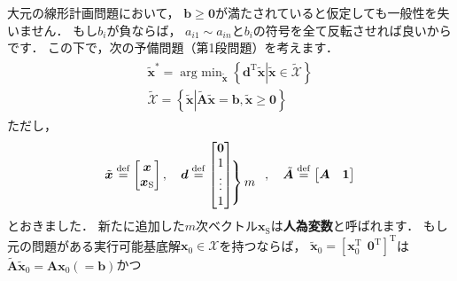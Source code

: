 ﻿\documentclass[a4paper]{jsarticle}
\begin{document}
大元の線形計画問題において，
$\boldsymbol{b}\geq\boldsymbol{0}$が満たされていると仮定しても一般性を失いません．
もし$b_{i}$が負ならば，
$a_{i1}\sim a_{in}$と$b_{i}$の符号を全て反転させれば良いからです．
この下で，次の予備問題（第1段問題）を考えます．
\begin{align}
\begin{array}{c}
\tilde{\boldsymbol{x}}^{*}=\mathop{\mathrm{arg~min}}_{\tilde{\boldsymbol{x}}}\left\{\boldsymbol{d}^{\mathrm{T}}\tilde{\boldsymbol{x}}\left|\tilde{\boldsymbol{x}}\in\tilde{\mathcal{X}}\right.\right\}
\\
\tilde{\mathcal{X}}=\left\{\tilde{\boldsymbol{x}}\left|
\tilde{\boldsymbol{A}}\tilde{\boldsymbol{x}}=\boldsymbol{b},
\tilde{\boldsymbol{x}}\geq\boldsymbol{0}
\right.
\right\}
\end{array}
\label{pb:lp0}
\end{align}
ただし，
\begin{align*}
\tilde{\boldsymbol{x}}\overset{\mathrm{def}}{=}
\begin{bmatrix}
\boldsymbol{x} \\ \boldsymbol{x}_{\mathrm{S}}
\end{bmatrix}
,\quad
\boldsymbol{d}\overset{\mathrm{def}}{=}
\begin{bmatrix}
\boldsymbol{0}
\\
1 \\ \vdots \\ 1
\end{bmatrix}
\hskip-2em
\left.\begin{array}{c}
\\
\left.\begin{array}{c}
\\
\\
\\
\end{array}\right\}m
\end{array}\right.
,\quad
\tilde{\boldsymbol{A}}\overset{\mathrm{def}}{=}
\begin{bmatrix}
\boldsymbol{A} & \boldsymbol{1}
\end{bmatrix}
\end{align*}
とおきました．
新たに追加した$m$次ベクトル$\boldsymbol{x}_{\mathrm{S}}$は{\bf 人為変数}と呼ばれます．
もし元の問題がある実行可能基底解$\boldsymbol{x}_{0}\in\mathcal{X}$を持つならば，
$\tilde{\boldsymbol{x}}_{0}=\left[\boldsymbol{x}_{0}^{\mathrm{T}}~~\boldsymbol{0}^{\mathrm{T}}\right]^{\mathrm{T}}$は
$\tilde{\boldsymbol{A}}\tilde{\boldsymbol{x}}_{0}=\boldsymbol{A}\boldsymbol{x}_{0}(=\boldsymbol{b})$かつ
\end{document}

